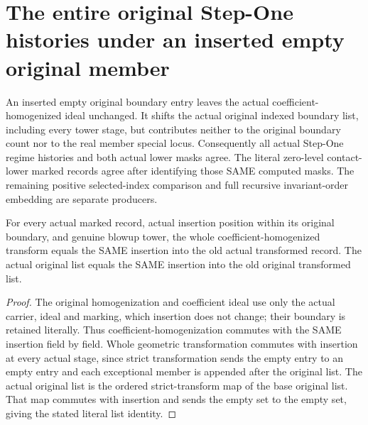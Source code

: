 \section{The entire original Step-One histories under an inserted empty original member}
An inserted empty original boundary entry leaves the actual coefficient-homogenized ideal unchanged. It shifts the actual original indexed boundary list, including every tower stage, but contributes neither to the original boundary count nor to the real member special locus. Consequently all actual Step-One regime histories and both actual lower masks agree. The literal zero-level contact-lower marked records agree after identifying those SAME computed masks. The remaining positive selected-index comparison and full recursive invariant-order embedding are separate producers.

\begin{lemma}
\label{hir:step-one-empty-insertion-transform}
\leanok
For every actual marked record, actual insertion position within its original boundary, and genuine blowup tower, the whole coefficient-homogenized transform equals the SAME insertion into the old actual transformed record. The actual original list equals the SAME insertion into the old original transformed list.
\end{lemma}
\begin{proof}
The original homogenization and coefficient ideal use only the actual carrier, ideal and marking, which insertion does not change; their boundary is retained literally. Thus coefficient-homogenization commutes with the SAME insertion field by field. Whole geometric transformation commutes with insertion at every actual stage, since strict transformation sends the empty entry to an empty entry and each exceptional member is appended after the original list. The actual original list is the ordered strict-transform map of the base original list. That map commutes with insertion and sends the empty set to the empty set, giving the stated literal list identity.
\end{proof}


